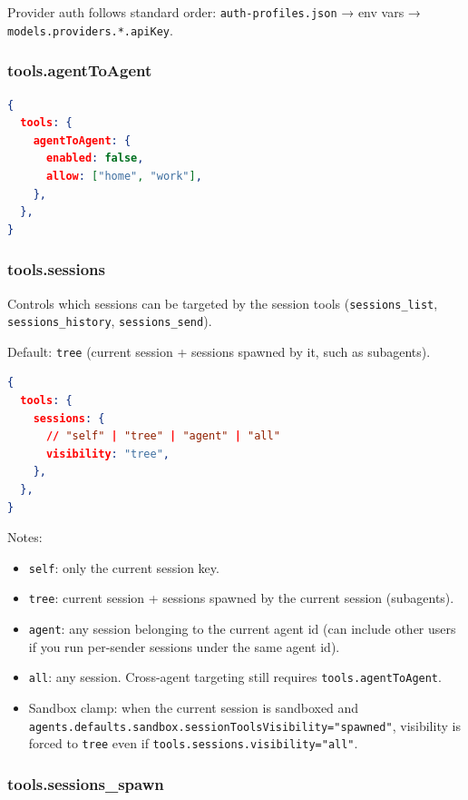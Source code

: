 Provider auth follows standard order: \texttt{auth-profiles.json} → env vars → \texttt{models.providers.*.apiKey}.


\subsubsection{tools.agentToAgent}


\begin{lstlisting}[language=json]
{
  tools: {
    agentToAgent: {
      enabled: false,
      allow: ["home", "work"],
    },
  },
}
\end{lstlisting}


\subsubsection{tools.sessions}


Controls which sessions can be targeted by the session tools (\texttt{sessions\_list}, \texttt{sessions\_history}, \texttt{sessions\_send}).

Default: \texttt{tree} (current session + sessions spawned by it, such as subagents).

\begin{lstlisting}[language=json]
{
  tools: {
    sessions: {
      // "self" | "tree" | "agent" | "all"
      visibility: "tree",
    },
  },
}
\end{lstlisting}


Notes:

\begin{itemize}
  \item \texttt{self}: only the current session key.
  \item \texttt{tree}: current session + sessions spawned by the current session (subagents).
  \item \texttt{agent}: any session belonging to the current agent id (can include other users if you run per-sender sessions under the same agent id).
  \item \texttt{all}: any session. Cross-agent targeting still requires \texttt{tools.agentToAgent}.
  \item Sandbox clamp: when the current session is sandboxed and \texttt{agents.defaults.sandbox.sessionToolsVisibility="spawned"}, visibility is forced to \texttt{tree} even if \texttt{tools.sessions.visibility="all"}.
\end{itemize}


\subsubsection{tools.sessions\_spawn}


